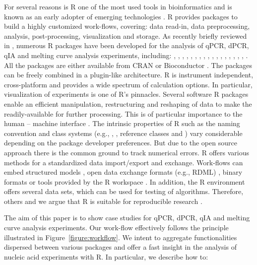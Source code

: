 For several reasons is R one of the most used tools in bioinformatics and is 
known as an early adopter of emerging technologies \citep{pabinger_2014}. R 
provides packages to build a highly customized work-flows, covering: data 
read-in, data preprocessing, analysis, post-processing, visualization and 
storage. As recently briefly reviewed in \citet{pabinger_2014}, numerous R 
packages have been developed for the analysis of qPCR, dPCR, qIA and melting 
curve analysis experiments, including: , , 
, , , , 
, , , , 
, , , , 
, , , 
. All the packages are either available from CRAN or 
Bioconductor \citep{gentleman_2004}. The packages can be freely combined in a 
plugin-like architecture. R is instrument independent, cross-platform and 
provides a wide spectrum of calculation options. In particular, visualization of 
experiments is one of R's pinnacles. Several software R packages enable an 
efficient manipulation, restructuring and reshaping of data to make the 
readily-available for further processing. This is of particular importance to 
the human -- machine interface \citep{Oh_2014}. The intrinsic properties of R 
such as the naming convention \citep{Baaaath_2012} and class systems (e.g., 
, , reference classes and ) vary considerable 
depending on the package developer preferences. But due to the open source 
approach there is the common ground to track numerical errors. R offers various 
methods for a standardized data import/export and exchange. Work-flows can embed 
structured models \citet{Guazzelli_2009}, open data exchange formats (e.g., RDML) , binary 
formats \citep{michna_2013} or tools provided by the R workspace 
\citep{RDCT2010c}. In addition, the R environment offers several data sets, 
which can be used for testing of algorithms. Therefore, others and we argue that 
R is suitable for reproducible research \citep{Gesmann_2011, Murrell_2012, 
gandrud_2013, hofmann_2013, Leeper_2014, liu_2014}. 

The aim of this paper is to show case studies for qPCR, dPCR, qIA and melting 
curve analysis experiments. Our work-flow effectively follows the principle 
illustrated in Figure~\ref{figure:workflow}. We intent to aggregate 
functionalities dispersed between various packages and offer a fast insight in 
the analysis of nucleic acid experiments with R. In particular, we describe how 
to:


